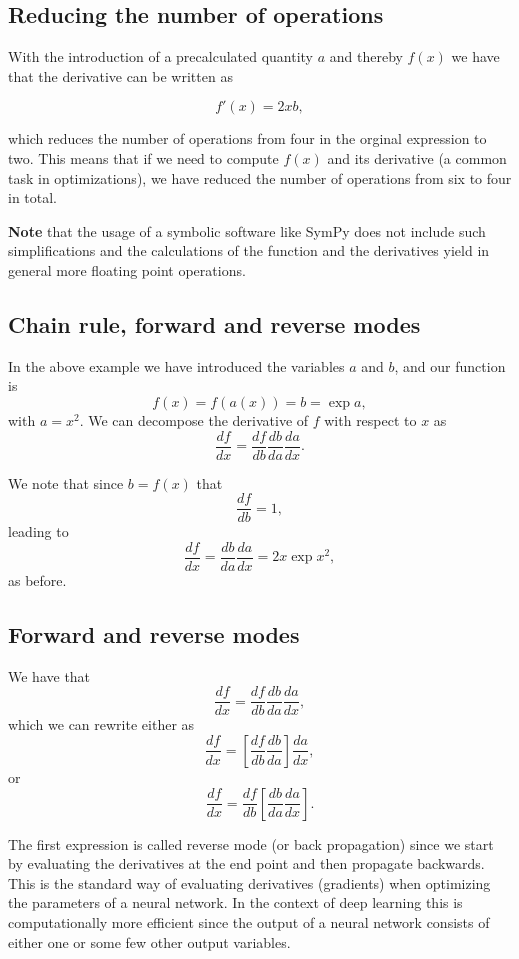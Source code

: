 \documentclass[%
oneside,                 %
final,                   %
10pt]{article}
\begin{document}
\subsection{Reducing the number of operations}

With the introduction of a precalculated quantity $a$ and thereby $f(x)$ we have that the derivative can be written as

\[
f'(x) = 2xb,
\]

which reduces the number of operations from four in the orginal
expression to two. This means that if we need to compute $f(x)$ and
its derivative (a common task in optimizations), we have reduced the
number of operations from six to four in total.

\textbf{Note} that the usage of a symbolic software like SymPy does not
include such simplifications and the calculations of the function and
the derivatives yield in general more floating point operations.

\subsection{Chain rule, forward and reverse modes}

In the above example we have introduced the variables $a$ and $b$, and our function is
\[
f(x) = f(a(x)) = b= \exp{a},
\]
with $a=x^2$. We can decompose the derivative of $f$ with respect to $x$ as
\[
\frac{df}{dx}=\frac{df}{db}\frac{db}{da}\frac{da}{dx}.
\]

We note that since $b=f(x)$ that
\[
\frac{df}{db}=1,
\]
leading to
\[
\frac{df}{dx}=\frac{db}{da}\frac{da}{dx}=2x\exp{x^2},
\]
as before.

\subsection{Forward and reverse modes}

We have that 
\[
\frac{df}{dx}=\frac{df}{db}\frac{db}{da}\frac{da}{dx},
\]
which we can rewrite either as
\[
\frac{df}{dx}=\left[\frac{df}{db}\frac{db}{da}\right]\frac{da}{dx},
\]
or
\[
\frac{df}{dx}=\frac{df}{db}\left[\frac{db}{da}\frac{da}{dx}\right].
\]

The first expression is called reverse mode (or back propagation)
since we start by evaluating the derivatives at the end point and then
propagate backwards. This is the standard way of evaluating
derivatives (gradients) when optimizing the parameters of a neural
network.  In the context of deep learning this is computationally
more efficient since the output of a neural network consists of either
one or some few other output variables.
\end{document}
